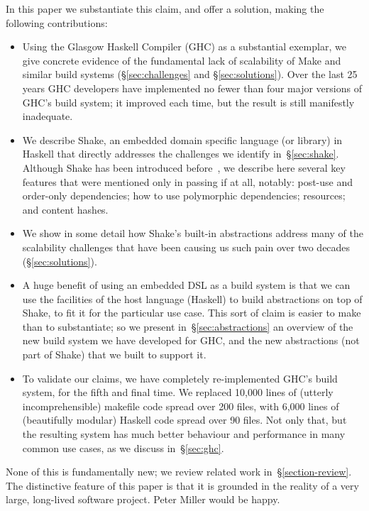 In this paper we substantiate this claim, and offer a solution,
making the following contributions:
\begin{itemize}
\item Using the Glasgow Haskell Compiler (GHC) as a substantial exemplar,
we give concrete evidence of the fundamental lack of scalability of
Make and similar build systems (\S\ref{sec:challenges} and
\S\ref{sec:solutions}). Over the last 25 years GHC developers have implemented
no fewer than four major versions of GHC's build system; it improved each
time, but the result is still manifestly inadequate.

\item We describe Shake, an embedded domain specific language (or library)
in Haskell that directly addresses the challenges we identify
in~\S\ref{sec:shake}.
Although Shake has been introduced before~\cite{shake}, we describe here
several key features that were mentioned only in passing if at all, notably:
post-use and order-only dependencies; how to use polymorphic dependencies;
resources; and content hashes.

\item We show in some detail how Shake's built-in abstractions address
many of the scalability challenges that have been causing us such pain over
two decades (\S\ref{sec:solutions}).

\item A huge benefit of using an embedded DSL as a build system is that
we can use the facilities of the host language (Haskell) to build
abstractions on top of Shake, to fit it for the particular use case.
This sort of claim is easier to make than to substantiate; so we present
in~\S\ref{sec:abstractions} an overview of the new build system we have
developed for GHC, and the new abstractions (not part of Shake) that we built
to support it.

\item To validate our claims, we have completely re-implemented GHC's
build system, for the fifth and final time.  We replaced 10,000 lines
of (utterly incomprehensible) makefile code spread over 200 files, with
6,000 lines of (beautifully modular) Haskell code spread over 90 files.
Not only that, but the resulting system has much better behaviour and
performance in many common use cases, as we discuss in~\S\ref{sec:ghc}.
\end{itemize}
None of this is fundamentally new; we review related work
in~\S\ref{section-review}.
The distinctive feature of this paper is that it is grounded in the reality
of a very large, long-lived software project.  Peter Miller would be happy.

